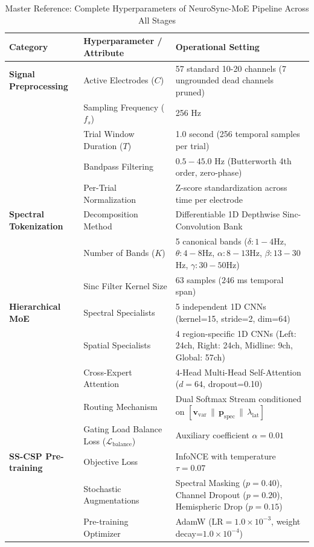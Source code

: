 \begin{table}[t]
\centering
\caption{Master Reference: Complete Hyperparameters of NeuroSync-MoE Pipeline Across All Stages}
\label{tab:master_hyperparameters}
\begin{tabular}{lll}
\hline
\textbf{Category} & \textbf{Hyperparameter / Attribute} & \textbf{Operational Setting} \\
\hline
\textbf{Signal Preprocessing} & Active Electrodes ($C$) & 57 standard 10-20 channels (7 ungrounded dead channels pruned) \\
& Sampling Frequency ($f_s$) & 256 Hz \\
& Trial Window Duration ($T$) & 1.0 second (256 temporal samples per trial) \\
& Bandpass Filtering & $0.5 - 45.0$ Hz (Butterworth 4th order, zero-phase) \\
& Per-Trial Normalization & Z-score standardization across time per electrode \\
\hline
\textbf{Spectral Tokenization} & Decomposition Method & Differentiable 1D Depthwise Sinc-Convolution Bank \\
& Number of Bands ($K$) & 5 canonical bands ($\delta: 1-4$Hz, $\theta: 4-8$Hz, $\alpha: 8-13$Hz, $\beta: 13-30$Hz, $\gamma: 30-50$Hz) \\
& Sinc Filter Kernel Size & 63 samples ($246$ ms temporal span) \\
\hline
\textbf{Hierarchical MoE} & Spectral Specialists & 5 independent 1D CNNs (kernel=15, stride=2, dim=64) \\
& Spatial Specialists & 4 region-specific 1D CNNs (Left: 24ch, Right: 24ch, Midline: 9ch, Global: 57ch) \\
& Cross-Expert Attention & 4-Head Multi-Head Self-Attention ($d=64$, dropout=0.10) \\
& Routing Mechanism & Dual Softmax Stream conditioned on $[\mathbf{v}_{\text{var}} \,\|\, \mathbf{p}_{\text{spec}} \,\|\, \lambda_{\text{lat}}]$ \\
& Gating Load Balance Loss ($\mathcal{L}_{\text{balance}}$) & Auxiliary coefficient $\alpha = 0.01$ \\
\hline
\textbf{SS-CSP Pre-training} & Objective Loss & InfoNCE with temperature $\tau = 0.07$ \\
& Stochastic Augmentations & Spectral Masking ($p=0.40$), Channel Dropout ($p=0.20$), Hemispheric Drop ($p=0.15$) \\
& Pre-training Optimizer & AdamW ($\text{LR}=1.0 \times 10^{-3}$, weight decay=$1.0 \times 10^{-4}$) \\

\end{tabular}
\end{table}
